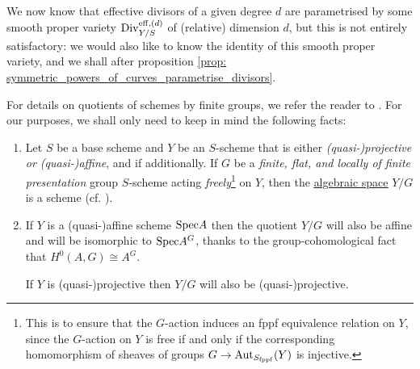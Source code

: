             We now know that effective divisors of a given degree $d$ are parametrised by some smooth proper variety $\mathrm{Div}_{Y/S}^{\mathrm{eff}, (d)}$ of (relative) dimension $d$, but this is not entirely satisfactory: we would also like to know the identity of this smooth proper variety, and we shall after proposition \ref{prop: symmetric_powers_of_curves_parametrise_divisors}.
            \begin{remark} \label{remark: quotients_of_schemes_by_finite_group_schemes}
                For details on quotients of schemes by finite groups, we refer the reader to \cite[Expos\'e V]{SGA1}. For our purposes, we shall only need to keep in mind the following facts: 
                    \begin{enumerate}
                        \item Let $S$ be a base scheme and $Y$ be an $S$-scheme that is either \textit{(quasi-)projective or (quasi-)affine}, and if additionally. If $G$ be a \textit{finite, flat, and locally of finite presentation} group $S$-scheme acting \textit{freely}\footnote{This is to ensure that the $G$-action induces an fppf equivalence relation on $Y$, since the $G$-action on $Y$ is free if and only if the corresponding homomorphism of sheaves of groups $G \to \mathrm{Aut}_{S_{\mathrm{fppf}}}(Y)$ is injective.} on $Y$, then the \href{https://stacks.math.columbia.edu/tag/025X}{\underline{algebraic space}} $Y/G$ is a scheme (cf. \cite[\href{https://stacks.math.columbia.edu/tag/07S7}{Tag 07S7}]{stacks}). 
                        \item If $Y$ is a (quasi-)affine scheme $\mathrm{Spec} A$ then the quotient $Y/G$ will also be affine and will be isomorphic to $\mathrm{Spec} A^G$, thanks to the group-cohomological fact that $H^0(A, G) \cong A^G$. 
                        
                        If $Y$ is (quasi-)projective then $Y/G$ will also be (quasi-)projective.
                    \end{enumerate}
            \end{remark}
            
